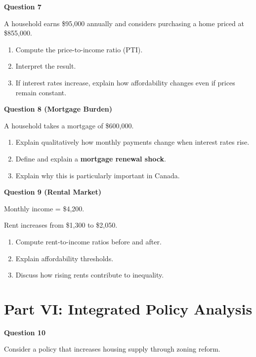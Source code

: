 \documentclass[12pt]{article}
\begin{document}
\textbf{Question 7}

A household earns \$95,000 annually and considers purchasing a home priced at \$855,000.

\begin{enumerate}[label=(\alph*)]
\item Compute the price-to-income ratio (PTI).
\item Interpret the result.
\item If interest rates increase, explain how affordability changes even if prices remain constant.
\end{enumerate}

\vspace{1em}

\textbf{Question 8 (Mortgage Burden)}

A household takes a mortgage of \$600,000.

\begin{enumerate}[label=(\alph*)]
\item Explain qualitatively how monthly payments change when interest rates rise.
\item Define and explain a \textbf{mortgage renewal shock}.
\item Explain why this is particularly important in Canada.
\end{enumerate}

\vspace{1em}

\textbf{Question 9 (Rental Market)}

Monthly income = \$4,200.

Rent increases from \$1,300 to \$2,050.

\begin{enumerate}[label=(\alph*)]
\item Compute rent-to-income ratios before and after.
\item Explain affordability thresholds.
\item Discuss how rising rents contribute to inequality.
\end{enumerate}
\newpage
\section*{Part VI: Integrated Policy Analysis}

\textbf{Question 10}

Consider a policy that increases housing supply through zoning reform.
\end{document}
